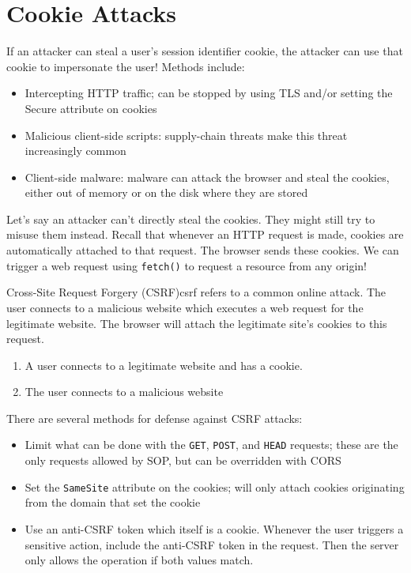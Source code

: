 \section{Cookie Attacks}
If an attacker can steal a user's session identifier cookie, the attacker can use that cookie to impersonate the user! Methods include:
\begin{itemize}
    \item Intercepting HTTP traffic; can be stopped by using TLS and/or setting the Secure attribute on cookies
    \item Malicious client-side scripts: supply-chain threats make this threat increasingly common
    \item Client-side malware: malware can attack the browser and steal the cookies, either out of memory or on the disk where they are stored
\end{itemize}

Let's say an attacker can't directly steal the cookies. They might still try to misuse them instead. Recall that whenever an HTTP request is made, cookies are automatically attached to that request. The browser sends these cookies. We can trigger a web request using \texttt{fetch()} to request a resource from any origin!

\begin{dfnbox}{Cross-Site Request Forgery (CSRF)}{csrf}
     refers to a common online attack. The user connects to a malicious website which executes a web request for the legitimate website. The browser will attach the legitimate site's cookies to this request.
\end{dfnbox}

\begin{enumerate}
    \item A user connects to a legitimate website and has a cookie.
    \item The user connects to a malicious website
\end{enumerate}

There are several methods for defense against CSRF attacks:
\begin{itemize}
    \item Limit what can be done with the \texttt{GET}, \texttt{POST}, and \texttt{HEAD} requests; these are the only requests allowed by SOP, but can be overridden with CORS
    \item Set the \texttt{SameSite} attribute on the cookies; will only attach cookies originating from the domain that set the cookie
    \item Use an anti-CSRF token which itself is a cookie. Whenever the user triggers a sensitive action, include the anti-CSRF token in the request. Then the server only allows the operation if both values match.
\end{itemize}

